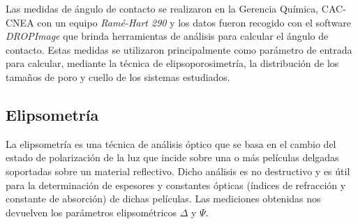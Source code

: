 		Las medidas de ángulo de contacto se realizaron en la Gerencia Química, CAC-CNEA con un equipo \textit{Ramé-Hart 290} y los datos fueron recogido con el software \textit{DROPImage} que brinda herramientas de análisis para calcular el ángulo de contacto. Estas medidas se utilizaron principalmente como parámetro de entrada para calcular, mediante la técnica de elipsoporosimetría, la distribución de los tamaños de poro y cuello de los sistemas estudiados.\cite{Boissiere2005}

	\subsection{Elipsometría}\label{sec:elipso}

		La elipsometría es una técnica de análisis óptico que se basa en el cambio del estado de polarización de la luz que incide sobre una o más películas delgadas soportadas sobre un material reflectivo. Dicho análisis es no destructivo y es útil para la determinación de espesores y constantes ópticas (índices de refracción y constante de absorción) de dichas películas.\cite{TompkinsHarlandG.1999,Rothen1945} Las mediciones obtenidas nos devuelven los parámetros elipsométricos $\Delta$ y $\Psi$. 

